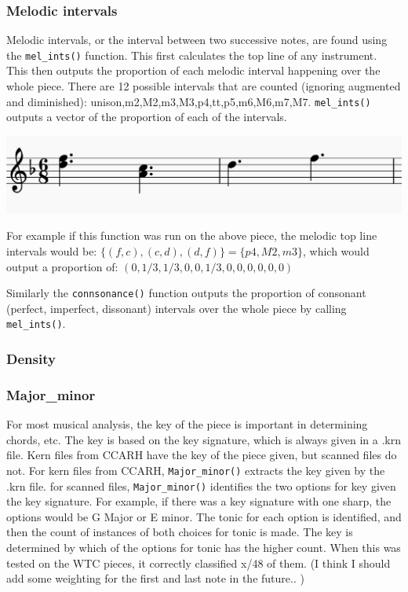 \documentclass[12pt,twoside]{reedthesis}
\theoremstyle{definition}
\theoremstyle{definition}
\theoremstyle{definition}
\theoremstyle{remark}
\begin{document}
\subsubsection{Melodic intervals}\label{melodic-intervals}

Melodic intervals, or the interval between two successive notes, are
found using the \texttt{mel\_ints()} function. This first calculates the
top line of any instrument. This then outputs the proportion of each
melodic interval happening over the whole piece. There are 12 possible
intervals that are counted (ignoring augmented and diminished):
unison,m2,M2,m3,M3,p4,tt,p5,m6,M6,m7,M7. \texttt{mel\_ints()} outputs a
vector of the proportion of each of the intervals.

\includegraphics{images/ex2.png}

For example if this function was run on the above piece, the melodic top
line intervals would be: \(\{(f,c),(c,d),(d,f)\} = \{p4,M2,m3\}\), which
would output a proportion of: \((0,1/3,1/3,0,0,1/3,0,0,0,0,0,0)\)

Similarly the \texttt{connsonance()} function outputs the proportion of
consonant (perfect, imperfect, dissonant) intervals over the whole piece
by calling \texttt{mel\_ints()}.

\subsubsection{Density}\label{density}

\subsubsection{Major\_minor}\label{major_minor}

For most musical analysis, the key of the piece is important in
determining chords, etc. The key is based on the key signature, which is
always given in a .krn file. Kern files from CCARH have the key of the
piece given, but scanned files do not. For kern files from CCARH,
\texttt{Major\_minor()} extracts the key given by the .krn file. for
scanned files, \texttt{Major\_minor()} identifies the two options for
key given the key signature. For example, if there was a key signature
with one sharp, the options would be G Major or E minor. The tonic for
each option is identified, and then the count of instances of both
choices for tonic is made. The key is determined by which of the options
for tonic has the higher count. When this was tested on the WTC pieces,
it correctly classified x/48 of them. (I think I should add some
weighting for the first and last note in the future.. )
\end{document}
